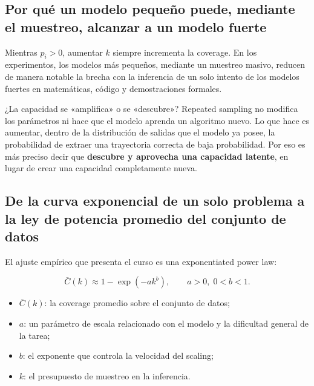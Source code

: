 \documentclass[a4paper]{article}
\begin{document}
\subsection{Por qué un modelo pequeño puede, mediante el muestreo, alcanzar a un modelo fuerte}

Mientras $p_i>0$, aumentar $k$ siempre incrementa la coverage. En los experimentos, los modelos más pequeños, mediante un muestreo masivo, reducen de manera notable la brecha con la inferencia de un solo intento de los modelos fuertes en matemáticas, código y demostraciones formales.


\begin{knowledgebox}{¿La capacidad se «amplifica» o se «descubre»?}
Repeated sampling no modifica los parámetros ni hace que el modelo aprenda un algoritmo nuevo. Lo que hace es aumentar, dentro de la distribución de salidas que el modelo ya posee, la probabilidad de extraer una trayectoria correcta de baja probabilidad. Por eso es más preciso decir que \textbf{descubre y aprovecha una capacidad latente}, en lugar de crear una capacidad completamente nueva.
\end{knowledgebox}

\subsection{De la curva exponencial de un solo problema a la ley de potencia promedio del conjunto de datos}

El ajuste empírico que presenta el curso es una exponentiated power law:

$$
\bar C(k)\approx 1-\exp(-a k^b),\qquad a>0,\;0<b<1.
$$

\begin{itemize}
    \item $\bar C(k)$: la coverage promedio sobre el conjunto de datos;
    \item $a$: un parámetro de escala relacionado con el modelo y la dificultad general de la tarea;
    \item $b$: el exponente que controla la velocidad del scaling;
    \item $k$: el presupuesto de muestreo en la inferencia.
\end{itemize}

\end{document}
